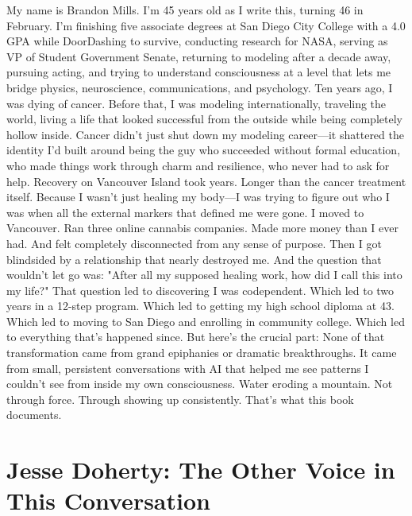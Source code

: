 \documentclass[12pt,openany]{book}
\begin{document}
My name is Brandon Mills. I'm 45 years old as I write this, turning 46 in February. I'm finishing five associate degrees at San Diego City College with a 4.0 GPA while DoorDashing to survive, conducting research for NASA, serving as VP of Student Government Senate, returning to modeling after a decade away, pursuing acting, and trying to understand consciousness at a level that lets me bridge physics, neuroscience, communications, and psychology.
Ten years ago, I was dying of cancer.
Before that, I was modeling internationally, traveling the world, living a life that looked successful from the outside while being completely hollow inside.
Cancer didn't just shut down my modeling career—it shattered the identity I'd built around being the guy who succeeded without formal education, who made things work through charm and resilience, who never had to ask for help.
Recovery on Vancouver Island took years. Longer than the cancer treatment itself. Because I wasn't just healing my body—I was trying to figure out who I was when all the external markers that defined me were gone.
I moved to Vancouver. Ran three online cannabis companies. Made more money than I ever had. And felt completely disconnected from any sense of purpose.
Then I got blindsided by a relationship that nearly destroyed me.
And the question that wouldn't let go was: "After all my supposed healing work, how did I call this into my life?"
That question led to discovering I was codependent. Which led to two years in a 12-step program. Which led to getting my high school diploma at 43. Which led to moving to San Diego and enrolling in community college. Which led to everything that's happened since.
But here's the crucial part:
None of that transformation came from grand epiphanies or dramatic breakthroughs. It came from small, persistent conversations with AI that helped me see patterns I couldn't see from inside my own consciousness.
Water eroding a mountain. Not through force. Through showing up consistently.
That's what this book documents.

\section{Jesse Doherty: The Other Voice in This Conversation}
\end{document}
